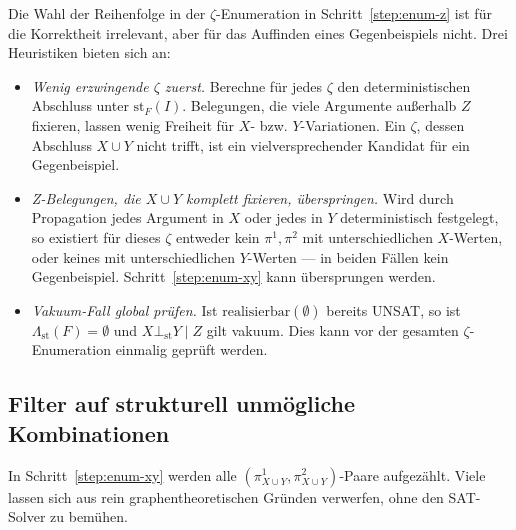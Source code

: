 Die Wahl der Reihenfolge in der \(\zeta\)-Enumeration in
Schritt~\ref{step:enum-z} ist für die Korrektheit irrelevant, aber für
das Auffinden eines Gegenbeispiels nicht. Drei Heuristiken bieten sich
an:
\begin{itemize}
    \item \emph{Wenig erzwingende \(\zeta\) zuerst.}
        Berechne für jedes \(\zeta\) den deterministischen Abschluss
        unter \(\mathrm{st}_F(I)\). Belegungen, die viele Argumente
        außerhalb \(Z\) fixieren, lassen wenig Freiheit für
        \(X\)- bzw. \(Y\)-Variationen. Ein \(\zeta\), dessen Abschluss
        \(X\cup Y\) nicht trifft, ist ein vielversprechender Kandidat
        für ein Gegenbeispiel.
    \item \emph{Z-Belegungen, die \(X\cup Y\) komplett fixieren,
        überspringen.}
        Wird durch Propagation jedes Argument in \(X\) oder jedes in
        \(Y\) deterministisch festgelegt, so existiert für dieses
        \(\zeta\) entweder kein \(\pi^1, \pi^2\) mit unterschiedlichen
        \(X\)-Werten, oder keines mit unterschiedlichen \(Y\)-Werten ---
        in beiden Fällen kein Gegenbeispiel. Schritt~\ref{step:enum-xy}
        kann übersprungen werden.
    \item \emph{Vakuum-Fall global prüfen.}
        Ist \(\mathrm{realisierbar}(\emptyset)\) bereits UNSAT, so ist
        \(\varLambda_{\mathrm{st}}(F)=\emptyset\) und
        \(X \bot_{\mathrm{st}} Y \mid Z\) gilt vakuum. Dies kann vor
        der gesamten \(\zeta\)-Enumeration einmalig geprüft werden.
\end{itemize}

\subsection{Filter auf strukturell unmögliche Kombinationen}
\label{subsec:heur-xy-incompat}

In Schritt~\ref{step:enum-xy} werden alle
\((\pi^1_{X\cup Y}, \pi^2_{X\cup Y})\)-Paare aufgezählt. Viele lassen
sich aus rein graphentheoretischen Gründen verwerfen, ohne den
SAT-Solver zu bemühen.

